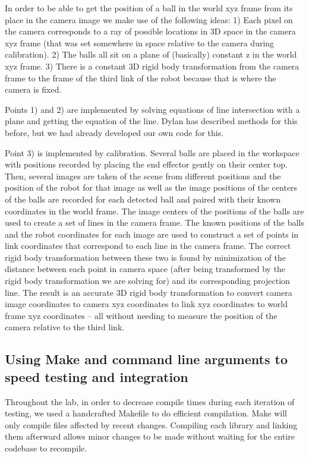 \documentclass{article}
\begin{document}
In order to be able to get the position of a ball in the world xyz frame from its place in the camera image we make use of the following ideas: 1) Each pixel on the camera corresponds to a ray of possible locations in 3D space in the camera xyz frame (that was set somewhere in space relative to the camera during calibration). 2) The balls all sit on a plane of (basically) constant z in the world xyz frame. 3) There is a constant 3D rigid body transformation from the camera frame to the frame of the third link of the robot because that is where the camera is fixed.

Points 1) and 2) are implemented by solving equations of line intersection with a plane and getting the equation of the line. Dylan has described methods for this before, but we had already developed our own code for this. 

Point 3) is implemented by calibration. Several balls are placed in the workspace with positions recorded by placing the end effector gently on their center top. Then, several images are taken of the scene from different positions and the position of the robot for that image as well as the image positions of the centers of the balls are recorded for each detected ball and paired with their known coordinates in the world frame. The image centers of the positions of the balls are used to create a set of lines in the camera frame. The known positions of the balls and the robot coordinates for each image are used to construct a set of points in link coordinates that correspond to each line in the camera frame. The correct rigid body transformation between these two is found by minimization of the distance between each point in camera space (after being transformed by the rigid body transformation we are solving for) and its corresponding projection line. The result is an accurate 3D rigid body transformation to convert camera image coordinates to camera xyz coordinates to link xyz coordinates to world frame xyz coordinates -- all without needing to measure the position of the camera relative to the third link. 

\subsection{Using Make and command line arguments to speed testing and integration}
Throughout the lab, in order to decrease compile times during each iteration of testing, we used a handcrafted Makefile to do efficient compilation. Make will only compile files affected by recent changes. Compiling each library and linking them afterward allows minor changes to be made without waiting for the entire codebase to recompile.
\end{document}
